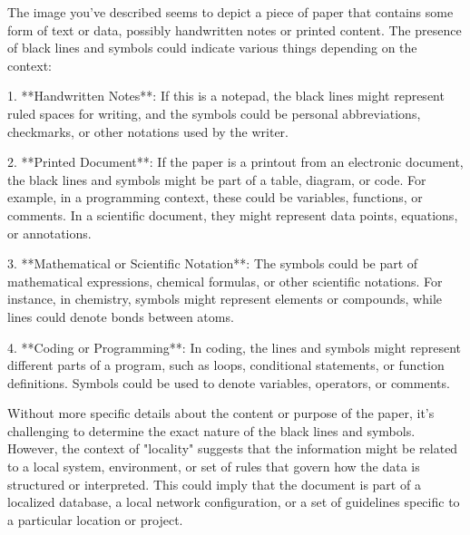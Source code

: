 The image you've described seems to depict a piece of paper that contains some form of text or data, possibly handwritten notes or printed content. The presence of black lines and symbols could indicate various things depending on the context:

1. **Handwritten Notes**: If this is a notepad, the black lines might represent ruled spaces for writing, and the symbols could be personal abbreviations, checkmarks, or other notations used by the writer.

2. **Printed Document**: If the paper is a printout from an electronic document, the black lines and symbols might be part of a table, diagram, or code. For example, in a programming context, these could be variables, functions, or comments. In a scientific document, they might represent data points, equations, or annotations.

3. **Mathematical or Scientific Notation**: The symbols could be part of mathematical expressions, chemical formulas, or other scientific notations. For instance, in chemistry, symbols might represent elements or compounds, while lines could denote bonds between atoms.

4. **Coding or Programming**: In coding, the lines and symbols might represent different parts of a program, such as loops, conditional statements, or function definitions. Symbols could be used to denote variables, operators, or comments.

Without more specific details about the content or purpose of the paper, it's challenging to determine the exact nature of the black lines and symbols. However, the context of "locality" suggests that the information might be related to a local system, environment, or set of rules that govern how the data is structured or interpreted. This could imply that the document is part of a localized database, a local network configuration, or a set of guidelines specific to a particular location or project.